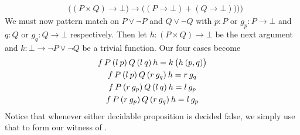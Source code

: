 \documentclass[11pt]{article}
\begin{document}
\begin{my proof}
\begin{itemize}
\begin{align*}
& \big((P \times Q) \to \bot \big) \to \big( (P \to \bot) + (Q \to \bot) \big) \Big) \bigg)
\end{align*}
We must now pattern match on $P \vee \neg P$ and $Q \vee \neg Q$ with $p \colon P$ or $g_p \colon P \to \bot$ and $q \colon Q$ or $g_q \colon Q \to \bot$ respectively. Then let $h \colon (P \times Q) \to \bot$ be the next argument and $k \colon \bot \to \neg P \vee \neg Q$ be a trivial function. Our four cases become \begin{gather*}
f \hspace{0.2em} P \hspace{0.2em} (l \hspace{0.2em} p) \hspace{0.2em} Q \hspace{0.2em} (l \hspace{0.2em} q) \hspace{0.2em} h = k \hspace{0.2em} \big(h \hspace{0.2em} (p,q) \big) \\
f \hspace{0.2em} P \hspace{0.2em} (l \hspace{0.2em} p) \hspace{0.2em} Q \hspace{0.2em} (r \hspace{0.2em} g_q) \hspace{0.2em} h = r \hspace{0.2em} g_q \\
f \hspace{0.2em} P \hspace{0.2em} (r \hspace{0.2em} g_p) \hspace{0.2em} Q \hspace{0.2em} (l \hspace{0.2em} q) \hspace{0.2em} h = l \hspace{0.2em} g_p \\
f \hspace{0.2em} P \hspace{0.2em} (r \hspace{0.2em} g_p) \hspace{0.2em} Q \hspace{0.2em} (r \hspace{0.2em} g_q) \hspace{0.2em} h = l \hspace{0.2em} g_p
\end{gather*}
Notice that whenever either decidable proposition is decided false, we simply use that to form our witness of . 


\end{itemize}
\end{my proof}
\end{document}
